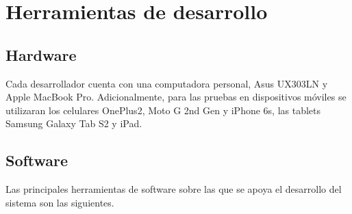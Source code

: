 \documentclass[a4paper,11pt]{article}
\begin{document}
\section{Herramientas de desarrollo}

\subsection{Hardware}

Cada desarrollador cuenta con una computadora personal, Asus UX303LN y Apple
MacBook Pro. Adicionalmente, para las pruebas en dispositivos móviles se
utilizaran los celulares OnePlus2, Moto G 2nd Gen y iPhone 6s, las tablets
Samsung Galaxy Tab S2 y iPad.

\subsection{Software}

Las principales herramientas de software sobre las que se apoya el desarrollo
del sistema son las siguientes.
\end{document}
